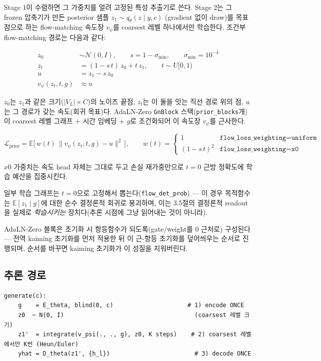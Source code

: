 \documentclass[11pt]{article}
\begin{document}
Stage 1이 수렴하면 그 가중치를 얼려 고정된 특성 추출기로 쓴다. Stage 2는
그 frozen 압축기가 만든 posterior 샘플 $z_1 \sim q_\theta(z\mid y,c)$
(gradient 없이 draw)를 목표점으로 하는 flow-matching 속도장 $v_\psi$를
coarsest 레벨 하나에서만 학습한다. 조건부 flow-matching 경로는 다음과
같다:

\begin{align}
z_0 &\sim \mathcal{N}(0, I), \qquad s = 1-\sigma_{\min}, \qquad \sigma_{\min}=10^{-4} \\
z_t &= (1-s\,t)\,z_0 + t\,z_1, \qquad t \sim U[0,1) \\
u &= z_1 - s\,z_0 \\
v_\psi(z_t, t, g) &\approx u
\end{align}

$z_0$는 $z_1$과 같은 크기($|V_L|\times C$)의 노이즈 끝점, $z_t$는 이 둘을
잇는 직선 경로 위의 점, $u$는 그 경로가 갖는 속도(회귀 목표)다.
AdaLN-Zero \texttt{GnBlock} 스택(\texttt{prior\_blocks}개)이 coarsest
레벨 그래프 + 시간 임베딩 + $g$로 조건화되어 이 속도장 $v_\psi$를
근사한다.

\begin{equation}
\mathcal{L}_{\text{prior}} = \mathbb{E}\big[\, w(t)\, \lVert v_\psi(z_t,t,g) - u \rVert^2 \,\big], \qquad
w(t) = \begin{cases} 1 & \texttt{flow\_loss\_weighting}=\texttt{uniform} \\ (1-s\,t)^2 & \texttt{flow\_loss\_weighting}=\texttt{x0} \end{cases}
\end{equation}

$x0$ 가중치는 속도 head 자체는 그대로 두고 손실 재가중만으로 $t=0$ 근방
정확도에 학습 예산을 집중시킨다.

일부 학습 그래프는 $t=0$으로 고정해서 뽑는다(\texttt{flow\_det\_prob})
--- 이 경우 목적함수는 $\mathbb{E}[z_1\mid g]$에 대한 순수 결정론적
회귀로 붕괴하며, 이는 3.5절의 결정론적 readout을 실제로 \textit{학습시키는}
장치다(추론 시점에 그냥 읽어내는 것이 아니라).

AdaLN-Zero 블록은 초기화 시 항등함수가 되도록(gate/weight를 0 근처로)
구성된다 --- 전역 kaiming 초기화를 먼저 적용한 뒤 이 근-항등 초기화를
덮어씌우는 순서로 진행되며, 순서를 바꾸면 kaiming 초기화가 이 성질을
지워버린다.

\subsection{추론 경로}

\begin{verbatim}
generate(c):
    g    = E_theta, blind(0, c)                     # 1) encode ONCE
    z0  ~ N(0, I)                                     (coarsest 레벨 크기)
    z1'  = integrate(v_psi(., ., g), z0, K steps)    # 2) coarsest 레벨에서만 K번 (Heun/Euler)
    yhat = D_theta(z1', {h_l})                        # 3) decode ONCE
\end{verbatim}
\end{document}
